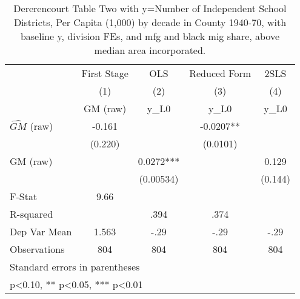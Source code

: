 \begin{table}[htbp]\centering
\def\sym#1{\ifmmode^{#1}\else\(^{#1}\)\fi}
\caption{Dererencourt Table Two with y=Number of Independent School Districts, Per Capita (1,000) by decade in County 1940-70, with baseline y, division FEs, and mfg and black mig share, above median area incorporated.}
\begin{tabular}{l*{4}{c}}
\toprule
                    & First Stage   &         OLS   &Reduced Form   &        2SLS   \\
                    &\multicolumn{1}{c}{(1)}&\multicolumn{1}{c}{(2)}&\multicolumn{1}{c}{(3)}&\multicolumn{1}{c}{(4)}\\
                    &\multicolumn{1}{c}{GM  (raw)}&\multicolumn{1}{c}{y\_L0}&\multicolumn{1}{c}{y\_L0}&\multicolumn{1}{c}{y\_L0}\\
\midrule
$\hat{GM}$ (raw)    &      -0.161   &               &     -0.0207** &               \\
                    &     (0.220)   &               &    (0.0101)   &               \\
\addlinespace
GM  (raw)           &               &      0.0272***&               &       0.129   \\
                    &               &   (0.00534)   &               &     (0.144)   \\
\midrule
F-Stat              &        9.66   &               &               &               \\
R-squared           &               &        .394   &        .374   &               \\
Dep Var Mean        &       1.563   &        -.29   &        -.29   &        -.29   \\
Observations        &         804   &         804   &         804   &         804   \\
\bottomrule
\multicolumn{5}{l}{\footnotesize Standard errors in parentheses}\\
\multicolumn{5}{l}{\footnotesize * p<0.10, ** p<0.05, *** p<0.01}\\
\end{tabular}
\end{table}
